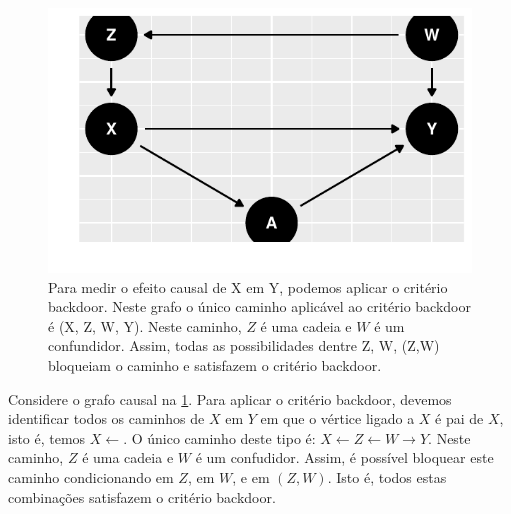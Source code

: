 \begin{example}
\begin{knitrout}
\color{fgcolor}\begin{figure}[t]

{\centering \includegraphics[width=\maxwidth]{figure/backdoor_ex_1-1} 

}

\caption[Para medir o efeito causal de X em Y, podemos aplicar o critério backdoor]{Para medir o efeito causal de X em Y, podemos aplicar o critério backdoor. Neste grafo o único caminho aplicável ao critério backdoor é (X, Z, W, Y). Neste caminho, $Z$ é uma cadeia e $W$ é um confundidor. Assim, todas as possibilidades dentre Z, W, (Z,W) bloqueiam o caminho e satisfazem o critério backdoor.}\label{fig:backdoor_ex_1}
\end{figure}

\end{knitrout}

 Considere o grafo causal na \cref{fig:backdoor_ex_1}.
 Para aplicar o critério backdoor, devemos identificar
 todos os caminhos de $X$ em $Y$ em que
 o vértice ligado a $X$ é pai de $X$, isto é,
 temos $X \leftarrow$. O único caminho deste tipo é:
 $X \leftarrow Z \leftarrow W \rightarrow Y$.
 Neste caminho, $Z$ é uma cadeia e $W$ é um confudidor.
 Assim, é possível bloquear este caminho condicionando
 em $Z$, em $W$, e em $(Z,W)$.
 Isto é, todos estas combinações 
 satisfazem o critério backdoor.
\end{example}

